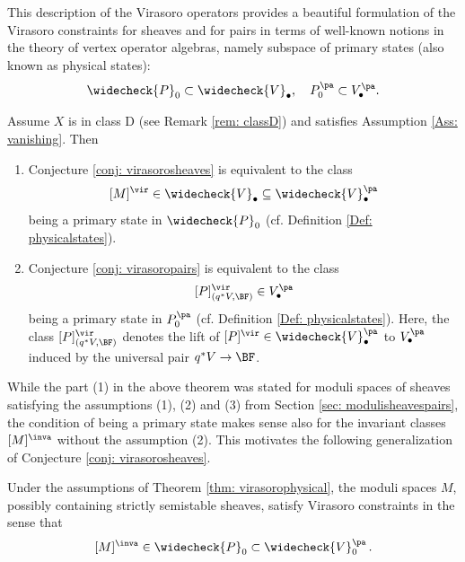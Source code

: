 This description of the Virasoro operators provides a beautiful formulation of the Virasoro constraints for sheaves and for pairs in terms of well-known notions in the theory of vertex operator algebras, namely subspace of primary states (also known as physical states):
$$\widecheck{P}_0\subset \widecheck{V}_\bullet,\quad P_0^{\pa} \subset V_\bullet^{\pa}.$$

\begin{theorem}
\notready\label{thm: virasorophysical}
Assume $X$ is in class D (see Remark \ref{rem: classD}) and satisfies Assumption \ref{Ass: vanishing}. Then
\begin{enumerate}
\item Conjecture \ref{conj: virasorosheaves} is equivalent to the class
\[
[M]^\vir\in \widecheck{V}_\bullet \subseteq \widecheck{V}^{\pa}_\bullet
\]
being a primary state in $\widecheck{P}_0$ (cf. Definition \ref{Def: physicalstates}).
\item Conjecture \ref{conj: virasoropairs} is equivalent to the class
\[
[P]_{(q^\ast V,\BF)}^\vir\in V^{\pa}_\bullet
\]
being a primary state in $P_0^{\pa}$
(cf. Definition \ref{Def: physicalstates}). Here, the class $[P]_{{(q^\ast V,\BF)}}^\vir$ denotes the lift of $[P]^\vir\in \widecheck{V}^{\pa}_\bullet$ to $V^{\pa}_\bullet$ induced by the universal pair $q^\ast V\to\BF$.
\end{enumerate}
\end{theorem}
While the part (1) in the above theorem was stated for moduli spaces of sheaves satisfying the assumptions (1), (2) and (3) from Section \ref{sec: modulisheavespairs}, the condition of being a primary state makes sense also for the invariant classes $[M]^{\inva}$ without the assumption (2). This motivates the following generalization of Conjecture \ref{conj: virasorosheaves}.
\begin{conjecture}
\notready
    \label{conj:actualinvvir}Under the assumptions of Theorem \ref{thm: virasorophysical}, the moduli spaces $M$, possibly containing strictly semistable sheaves, satisfy Virasoro constraints in the sense that
  $$
  [M]^{\inva}\in \widecheck{P}_0\subset  \widecheck{V}^{\pa}_{0}\,.
  $$
\end{conjecture}

